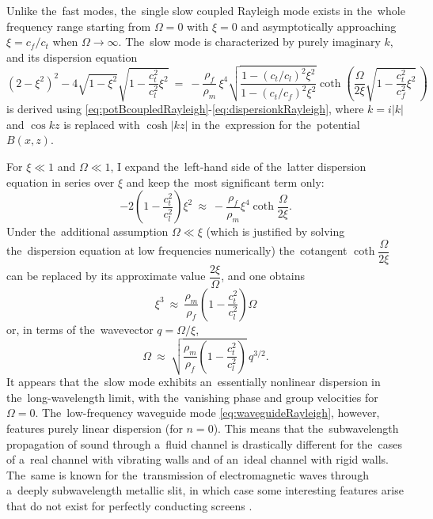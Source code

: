 Unlike the~fast modes, the~single slow coupled Rayleigh mode exists in the~whole frequency range starting from $\Omega=0$ with $\xi=0$ and asymptotically approaching $\xi=c_f/c_t$ when $\Omega \rightarrow \infty$.
The~slow mode is characterized by purely imaginary $k$, and its dispersion equation
\begin{equation}
\label{eq:dispSlowRayleigh}
\left(2-\xi^2\right)^2-4\sqrt{1-\xi^2}\sqrt{1-\frac{c_t^2}{c_l^2}\xi^2}
~=~-\frac{\rho_f}{\rho_m}\,\xi^4 \sqrt{\frac{1-\left(c_t/c_l\right)^2\xi^2}{1-\left(c_t/c_f\right)^2\xi^2}}\coth\!\left(\frac{\Omega}{2\xi}\sqrt{1-\frac{c_t^2}{c_f^2} \xi^2}\,\right)
\end{equation}
is derived using \cref{eq:potBcoupledRayleigh}-\cref{eq:dispersionkRayleigh}, where $k=i|k|$ and $\cos kz$ is replaced with $\cosh |kz|$ in the~expression for the~potential $B(x,z)$.

For $\xi \ll 1$ and $\Omega \ll 1$, I expand the~left-hand side of the~latter dispersion equation in series over $\xi$ and keep the~most significant term only:
\begin{equation}
-2\left(1-\frac{c_t^2}{c_l^2}\right)\xi^2~\approx~-\frac{\rho_f}{\rho_m}\xi^4 \coth \frac{\Omega}{2\xi}.
\end{equation}
Under the~additional assumption $\Omega \ll \xi$ (which is justified by solving the~dispersion equation at low frequencies numerically) the~cotangent $\coth\dfrac{\Omega}{2\xi}$ can be replaced by its approximate value $\dfrac{2\xi}{\Omega}$, and one obtains
\begin{equation}
\xi^3~\approx~\frac{\rho_m}{\rho_f}\left(1-\frac{c_t^2}{c_l^2}\right)\Omega
\end{equation}
or, in terms of the~wavevector $q=\Omega/\xi$,
\begin{equation}
\label{eq:asymptSlowRayleigh}
\Omega~\approx~\sqrt{\frac{\rho_m}{\rho_f}\left(1-\frac{c_t^2}{c_l^2}\right)}\,q^{3/2}.
\end{equation}
It appears that the~slow mode exhibits an~essentially nonlinear dispersion in the~long-wavelength limit, with the~vanishing phase and group velocities for $\Omega=0$.
The~low-frequency waveguide mode \cref{eq:waveguideRayleigh}, however, features purely linear dispersion (for $n=0$).
This means that the~subwavelength propagation of sound through a~fluid channel is drastically different for the~cases of a~real channel with vibrating walls and of an~ideal channel with rigid walls.
The~same is known for the~transmission of electromagnetic waves through a~deeply subwavelength metallic slit, in which case some interesting features arise that do not exist for perfectly conducting screens \cite{seo,xia}.

